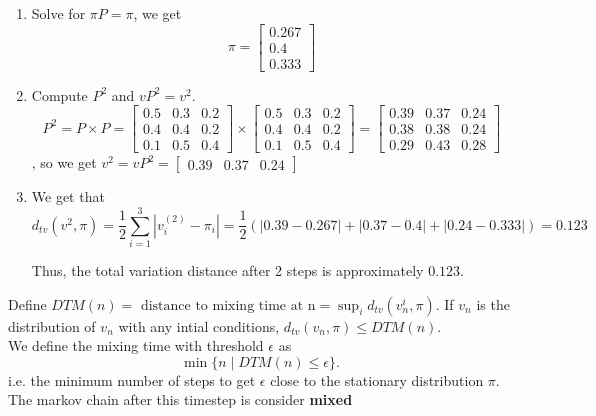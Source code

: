 \documentclass[a4paper]{article}
\begin{document}
\begin{enumerate}
  \item Solve for $\pi P = \pi$, we get \[
\pi = \begin{bmatrix} 0.267 \\ 0.4 \\ 0.333 \end{bmatrix}
\]
\item Compute $P^{2}$ and $vP^{2} =v^{2}$. \[
P^2 = P \times P = \begin{bmatrix} 
0.5 & 0.3 & 0.2 \\
0.4 & 0.4 & 0.2 \\
0.1 & 0.5 & 0.4 
\end{bmatrix} \times \begin{bmatrix} 
0.5 & 0.3 & 0.2 \\
0.4 & 0.4 & 0.2 \\
0.1 & 0.5 & 0.4 
\end{bmatrix} = \begin{bmatrix} 
0.39 & 0.37 & 0.24 \\
0.38 & 0.38 & 0.24 \\
0.29 & 0.43 & 0.28 
\end{bmatrix}
\], so we get $v^{2} = vP^{2} = \begin{bmatrix} 0.39 & 0.37 & 0.24 \end{bmatrix}$
\item We get that \[
d_{tv}(v^{2}, \pi) = \frac{1}{2} \sum_{i=1}^3 \left| v_i^{(2)} - \pi_i \right| = \frac{1}{2} \left( |0.39 - 0.267| + |0.37 - 0.4| + |0.24 - 0.333| \right) = 0.123
\]

Thus, the total variation distance after 2 steps is approximately \( 0.123 \).
\end{enumerate}

\begin{definition}
  Define $DTM(n) = \text{ distance to mixing time at n} = \sup_{i} d_{t v} (v^{i}_n, \pi)$. If $v_n$ is the distribution of  $v_n$ with any intial conditions,  $d_{t v} (v_n, \pi) \leq DTM(n)$. \\


  We define the mixing time with threshold $\epsilon$ as 
  \[
    \min \{n \mid DTM(n) \leq \epsilon \} 
  .\] 
  i.e. the minimum number of steps to get  $\epsilon$ close to the stationary distribution  $\pi$. The markov chain after this timestep is consider \textbf{mixed}
\end{definition}
\end{document}
